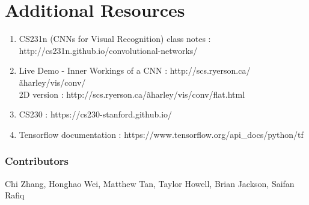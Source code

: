 \documentclass[twoside]{article}
\begin{document}
\section{Additional Resources}
\begin{enumerate}
    \item CS231n (CNNs for Visual Recognition) class notes : http://cs231n.github.io/convolutional-networks/
    \item Live Demo - Inner Workings of a CNN : http://scs.ryerson.ca/\~aharley/vis/conv/ \\
 2D version : http://scs.ryerson.ca/\~aharley/vis/conv/flat.html
\item CS230 : https://cs230-stanford.github.io/
\item Tensorflow documentation : https://www.tensorflow.org/api\_docs/python/tf
\end{enumerate}





\subsubsection*{Contributors}
Chi Zhang, Honghao Wei, Matthew Tan, Taylor Howell, Brian Jackson, Saifan Rafiq
\end{document}
